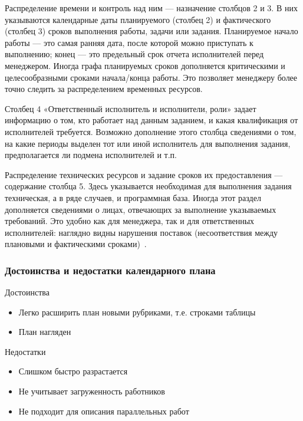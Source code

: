 \documentclass{../industrial-development}
\begin{document}
Распределение времени и контроль над ним — назначение столбцов 2 и 3. В них указываются календарные даты планируемого (столбец 2) и фактического (столбец 3) сроков выполнения работы, задачи или задания. Планируемое начало работы — это самая ранняя дата, после которой можно приступать к выполнению; конец — это предельный срок отчета исполнителей перед менеджером. Иногда графа планируемых сроков дополняется критическими и целесообразными сроками начала/конца работы. Это позволяет менеджеру более точно следить за распределением временных ресурсов.

Столбец 4 «Ответственный исполнитель и исполнители, роли» задает информацию о том, кто работает над данным заданием, и какая квалификация от исполнителей требуется. Возможно дополнение этого столбца сведениями о том, на какие периоды выделен тот или иной исполнитель для выполнения задания, предполагается ли подмена исполнителей и т.п.

Распределение технических ресурсов и задание сроков их предоставления — содержание столбца 5. Здесь указывается необходимая для выполнения задания техническая, а в ряде случаев, и программная база. Иногда этот раздел дополняется сведениями о лицах, отвечающих за выполнение указываемых требований. Это удобно как для менеджера, так и для ответственных исполнителей: наглядно видны нарушения поставок (несоответствия между плановыми и фактическими сроками)~\cite[с.~49]{Skopin}.

\begin{frame} \frametitle{Достоинства и недостатки календарного плана}
  \begin{block}{Достоинства}
    \begin{itemize}
     \item Легко расширить план новыми рубриками, т.е. строками таблицы
     \item План нагляден
    \end{itemize}
  \end{block}
  \begin{block}{Недостатки}
    \begin{itemize}
     \item Слишком быстро разрастается
     \item Не учитывает загруженность работников
     \item Не подходит для описания параллельных работ
    \end{itemize}
  \end{block}
\end{frame}
\end{document}
